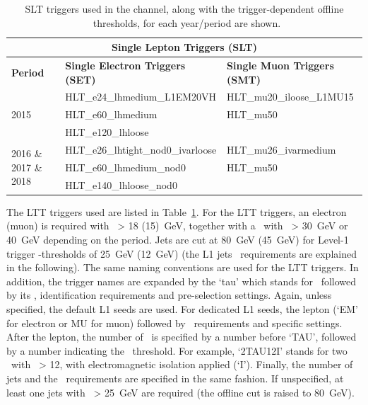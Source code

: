 \begin{table}
  \scriptsize
  \begin{tabular}{lll}
    \midrule
    \multicolumn{3}{c}{\textbf{Single Lepton Triggers (SLT)}} \\
    \midrule
    \textbf{Period} & \textbf{Single Electron Triggers (SET)} 
    & \textbf{Single Muon Triggers (SMT)}   \\
    \midrule 
    \multirow{3}{*}{2015} & HLT\_e24\_lhmedium\_L1EM20VH &HLT\_mu20\_iloose\_L1MU15\\
    & HLT\_e60\_lhmedium  & HLT\_mu50  \\
    & HLT\_e120\_lhloose & \\
    \midrule
    \multirow{3}{*}{2016 \& 2017 \& 2018} & HLT\_e26\_lhtight\_nod0\_ivarloose  & HLT\_mu26\_ivarmedium \\
    & HLT\_e60\_lhmedium\_nod0  & HLT\_mu50\\
    & HLT\_e140\_lhloose\_nod0 \\
 \bottomrule
  \end{tabular}
 \caption{SLT triggers used in the \lephad channel, 
 along with the trigger-dependent offline \pT\ thresholds, for each year/period are shown.}
  \label{tab:SLTtriggers_lephad}
\end{table}


The LTT triggers used are listed in Table~\ref{tab:SLTtriggers_lephad}. 
For the LTT triggers, an electron (muon) is required with
\pt\ > 18 (15)~GeV, together with 
a \tauhad\ with \pt\ > 30~GeV or 40~GeV depending on the period.
Jets are cut at 80~GeV (45~GeV) for Level-1 trigger \pt-thresholds of 25~GeV (12~GeV)
(the L1 jets \pt\ requirements are explained in the following). 
The same naming conventions are used for the LTT triggers. 
In addition, the trigger names are expanded by the `tau' which 
stands for \tauhad\ followed by its \pt, identification requirements
and pre-selection settings. Again, unless specified, the default
L1 seeds are used. For dedicated L1 seeds, the lepton (`EM' for electron
or MU for muon) followed by \pt\ requirements and specific settings. 
After the lepton, the number of \tauhad\ is specified by a number before 
`TAU', followed by a number indicating the \pt\ threshold. For example, 
`2TAU12I' stands for two \tauhad\ with \pt\ > 12, with electromagnetic
isolation applied (`I'). Finally, the number of jets and the \pt\ requirements
are specified in the same fashion. If unspecified, at least one jets with \pt\ > 25~GeV
are required (the offline cut is raised to 80~GeV).

